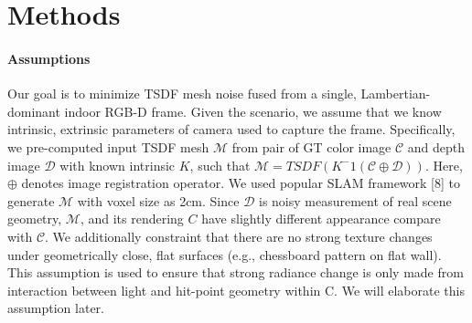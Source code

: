 \section{Methods}

\paragraph{Assumptions}
Our goal is to minimize TSDF mesh noise fused from 
a single, Lambertian-dominant indoor RGB-D frame. 
Given the scenario, we assume that we know intrinsic, extrinsic parameters of camera used to capture the frame. 
Specifically, we pre-computed input TSDF mesh $\mathcal{M}$ from 
pair of GT color image $\mathcal{C}$ and depth image $\mathcal{D}$ with known intrinsic $K$, such that $\mathcal{M}=TSDF(K^-1(\mathcal{C}\oplus\mathcal{D}))$.
Here, $\oplus$  denotes image registration operator. 
We used popular SLAM framework [8] to generate $\mathcal{M}$ with voxel size as 2cm. 
Since $\mathcal{D}$ is noisy measurement of real scene geometry, 
$\mathcal{M}$, and its rendering $C$ have slightly different appearance compare with $\mathcal{C}$. 
We additionally constraint that there are no strong texture changes 
under geometrically close, flat surfaces (e.g., chessboard pattern on flat wall). 
This assumption is used to ensure that strong radiance change is 
only made from interaction between light and hit-point geometry within C. 
We will elaborate this assumption later.
